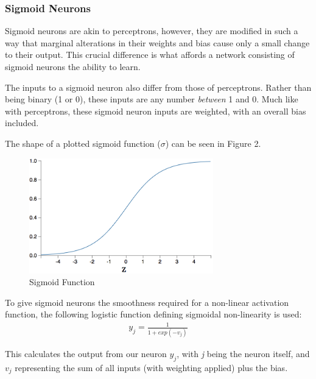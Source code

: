 \documentclass[12pt,a4paper]{article}
\begin{document}
\subsubsection{Sigmoid Neurons}

Sigmoid neurons are akin to perceptrons, however, they are modified in such a way that marginal alterations in their weights and bias cause only a small change to their output\citep{NeuralNetworksAndDeepLearning}. This crucial difference is what affords a network consisting of sigmoid neurons the ability to learn.

The inputs to a sigmoid neuron also differ from those of perceptrons. Rather than being binary (1 or 0), these inputs are any number \textit{between} 1 and 0. %
Much like with perceptrons, these sigmoid neuron inputs are weighted, with an overall bias included. 

The shape of a plotted sigmoid function ($\sigma$) can be seen in Figure 2. 

\begin{figure}[h]
	\includegraphics[width=\textwidth, height=5cm]{SigmoidFunction.png}
	\caption{Sigmoid Function} 
\end{figure}

To give sigmoid neurons the smoothness required for a non-linear activation function, the following logistic function defining sigmoidal non-linearity is used:
\begin{eqnarray}
y_j = \frac{1}{1+exp(-v_j)}
\end{eqnarray}

\begin{center}
	\citep[Chapter 4, page 179] {NeuralNetworksAComprehensiveFoundation}
\end{center}

This calculates the output from our neuron \textit{{$y_j$}}, with \textit{j} being the neuron itself, and \textit{$v_j$} representing the sum of all inputs (with weighting applied) plus the bias\citep{NeuralNetworksAComprehensiveFoundation}.
\end{document}
